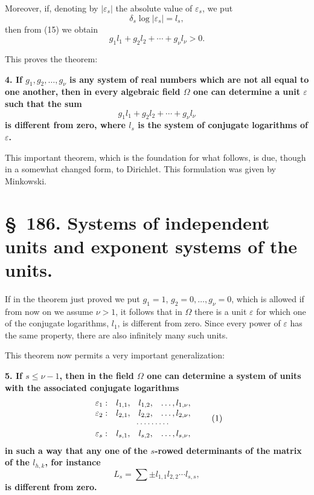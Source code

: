 \documentclass[11pt]{article}
\begin{document}
Moreover, if, denoting by $|\varepsilon_s|$ the absolute value of $\varepsilon_s$, we put
\begin{equation}
\delta_s\log|\varepsilon_s|=l_s,
\tag{16}
\end{equation}
then from (15) we obtain
\begin{equation}
g_1l_1+g_2l_2+\cdots+g_\nu l_\nu>0.
\tag{17}
\end{equation}

This proves the theorem:

\textbf{4. If $g_1,g_2,\ldots,g_\nu$ is any system of real numbers which are not all equal to one another, then in every algebraic field $\Omega$ one can determine a unit $\varepsilon$ such that the sum}
\[
g_1l_1+g_2l_2+\cdots+g_\nu l_\nu
\]
\textbf{is different from zero, where $l_s$ is the system of conjugate logarithms of $\varepsilon$.}

This important theorem, which is the foundation for what follows, is due, though in a somewhat changed form, to Dirichlet. This formulation was given by Minkowski.

\section*{\S~186. Systems of independent units and exponent systems of the units.}

If in the theorem just proved we put $g_1=1$, $g_2=0,\ldots,g_\nu=0$, which is allowed if from now on we assume $\nu>1$, it follows that in $\Omega$ there is a unit $\varepsilon$ for which one of the conjugate logarithms, $l_1$, is different from zero. Since every power of $\varepsilon$ has the same property, there are also infinitely many such units.

This theorem now permits a very important generalization:

\textbf{5. If $s\leq \nu-1$, then in the field $\Omega$ one can determine a system of units with the associated conjugate logarithms}
\begin{equation}
\begin{array}{cccc}
\varepsilon_1: & l_{1,1},&l_{1,2},&\ldots,l_{1,\nu},\\
\varepsilon_2: & l_{2,1},&l_{2,2},&\ldots,l_{2,\nu},\\
&\multicolumn{3}{c}{\cdots\cdots\cdots}\,\\
\varepsilon_s: & l_{s,1},&l_{s,2},&\ldots,l_{s,\nu},
\end{array}
\tag{1}
\end{equation}
\textbf{in such a way that any one of the $s$-rowed determinants of the matrix of the $l_{h,k}$, for instance}
\[
L_s=\sum \pm l_{1,1}l_{2,2}\cdots l_{s,s},
\]
\textbf{is different from zero.}
\end{document}
